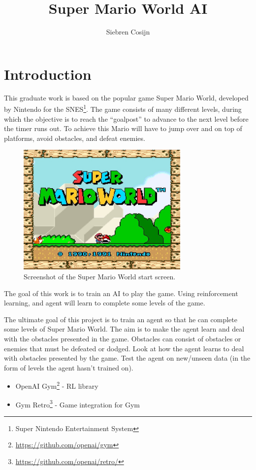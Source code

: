 \documentclass[a4paper]{article}
\title{Super Mario World AI}
\author{Siebren Cosijn}
\date{\displaydate{date}}
\begin{document}
\maketitle

\section{Introduction} \label{s:introduction}
This graduate work is based on the popular game Super Mario World, developed by Nintendo for the SNES\footnote{Super Nintendo Entertainment System}.
The game consists of many different levels, during which the objective is to reach the ``goalpost'' to advance to the next level before the timer runs out.
To achieve this Mario will have to jump over and on top of platforms, avoid obstacles, and defeat enemies.

\begin{figure}[htbp]
    \centering
    \includegraphics[width=0.75\textwidth]{start-screen}
    \caption{Screenshot of the Super Mario World start screen.}
    \label{fig:smw}
\end{figure}

The goal of this work is to train an AI to play the game.
Using reinforcement learning, and agent will learn to complete some levels of the game.

The ultimate goal of this project is to train an agent so that he can complete some levels of Super Mario World.
The aim is to make the agent learn and deal with the obstacles presented in the game.
Obstacles can consist of obstacles or enemies that must be defeated or dodged.
Look at how the agent learns to deal with obstacles presented by the game.
Test the agent on new/unseen data (in the form of levels the agent hasn't trained on).

\begin{itemize}
    \item OpenAI Gym\footnote{\url{https://github.com/openai/gym}} \cite{brockman2016openai} - RL library
    \item Gym Retro\footnote{\url{https://github.com/openai/retro/}} - Game integration for Gym
\end{itemize}
\end{document}
